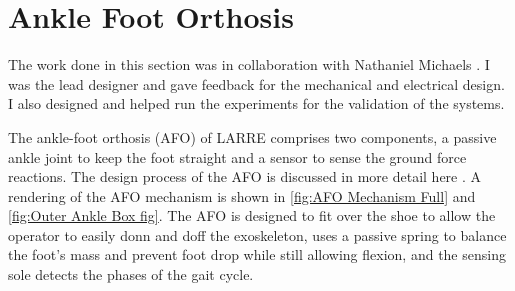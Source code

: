 
\section{Ankle Foot Orthosis}
\label{sec:ankle}
The work done in this section was in collaboration with Nathaniel Michaels \cite{michaels2020modular}. I was the lead designer and gave feedback for the mechanical and electrical design. I also designed and helped run the experiments for the validation of the systems. 

The ankle-foot orthosis (AFO) of LARRE comprises two components, a passive ankle joint to keep the foot straight and a sensor to sense the ground force reactions. The design process of the AFO is discussed in more detail here \cite{Michaels2020}.  A rendering of the AFO mechanism is shown in \autoref{fig:AFO Mechanism Full} and \autoref{fig:Outer Ankle Box fig}. The AFO is designed to fit over the shoe to allow the operator to easily donn and doff the exoskeleton, uses a passive spring to balance the foot's mass and prevent foot drop while still allowing flexion, and the sensing sole detects the phases of the gait cycle. 

